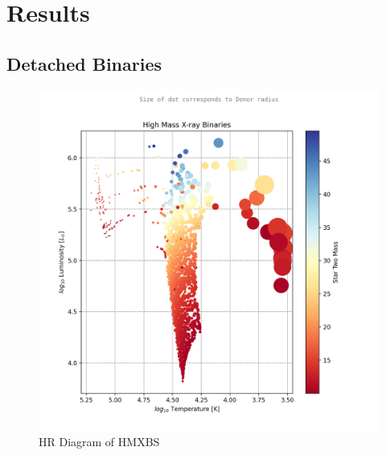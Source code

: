 \documentclass[12pt, a4paper]{article}
\begin{document}
    \section{\centering Results}

    \subsection{\centering Detached Binaries}
    \begin{figure}[H] 
        \centering
        \includegraphics[scale = .6]{figs/GeneratedFigs/ High Mass X-ray Binaries Star Two Mass log10 F star radius T.png}
        \caption{HR Diagram of HMXBS}
        \label{DetachedBinaryHRDiagram}
    \end{figure}
\end{document}
